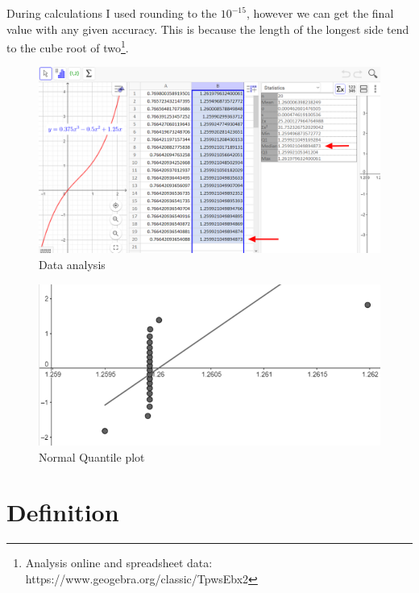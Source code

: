 \documentclass[12pt, letterpaper, oneside]{report}
\begin{document}
During calculations I used rounding to the  $10^{-15}$, however we can get the final value with any given accuracy. This is because the length of the longest side tend to the cube root of two\footnote{Analysis online and spreadsheet data:  https://www.geogebra.org/classic/TpwsEbx2}.
\\
\begin{figure}[h]
	\centering
	\includegraphics[width=0.9\linewidth]{images/Table_arrow.png}
	\caption{Data analysis}
	\label{fig:data}
\end{figure}
\begin{figure}[h]
	\centering
	\includegraphics[width=0.9\linewidth]{images/plot.png}
	\caption{Normal Quantile plot}
	\label{fig:plot}
\end{figure}
\newpage

\section{Definition}
\end{document}
